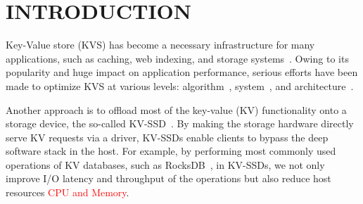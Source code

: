 \documentclass{abstract_hutech}
\begin{document}
\thispagestyle{firstpage}

\section{INTRODUCTION}
Key-Value store (KVS) has become a necessary infrastructure for many applications, such as caching, web indexing, and storage systems~\cite{memcached,tao,bigtable,dynamo}.  
Owing to its popularity and huge impact on application performance, serious efforts have been made to optimize KVS at various levels: algorithm~\cite{silk,dostoevsky,monkey,blsm},
system~\cite{wisckey,wang2014efficient,flashstore}, and architecture~\cite{bluecache,kvs-fpga1,kvs-fpga2}.

Another approach is to offload most of the key-value (KV) functionality onto a storage device, the so-called KV-SSD~\cite{kvssd,kaml,nvmkv,bluecache}.  
By making the storage hardware directly serve KV requests via a driver, KV-SSDs enable clients to bypass the deep software stack in the host.
For example, by performing most commonly used operations of KV databases, such as RocksDB~\cite{rocksdb}, 
in KV-SSDs, we not only improve I/O latency and throughput of the operations but also reduce host resources \textcolor{red}{CPU and Memory}.
\end{document}
